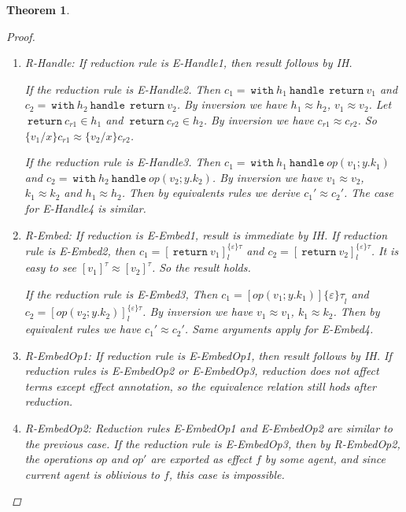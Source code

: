 \documentclass{article}
\newtheorem{theorem}{Theorem}[section]
\theoremstyle{definition}
\newcommand{\m}[1]{\ \texttt{#1}\ }
\begin{document}
\begin{theorem}
\begin{proof}
\begin{enumerate}
\item R-Handle: If reduction rule is E-Handle1, then result follows by IH. 

If the reduction rule is E-Handle2. Then $c_1 = \m{with} h_1 \m{handle} \m{return} v_1$ and $c_2 = \m{with} h_2 \m{handle} \m{return} v_2$. By inversion we have $h_1 \approx h_2$, $v_1 \approx v_2$.  Let $\m{return} c_{r1} \in h_1$ and $\m{return} c_{r2} \in h_2$. By inversion we have $c_{r1} \approx c_{r2}$. So $\{v_1/x\}c_{r1} \approx \{v_2/x\}c_{r2}$.

If the reduction rule is E-Handle3. Then $c_1 = \m{with} h_1 \m{handle} op(v_1; y. k_1)$ and $c_2 = \m{with} h_2 \m{handle} op(v_2; y.k_2) $. By inversion we have $v_1 \approx v_2$, $k_1 \approx k_2$ and $h_1 \approx h_2$. Then by equivalents rules we derive $c_1' \approx c_2'$. The case for E-Handle4 is similar.

\item R-Embed: If reduction is E-Embed1,  result is immediate by IH. If reduction rule is E-Embed2, then $c_1 = [\m{return} v_1]^{\{\varepsilon\}\tau}_l$ and $c_2 = [\m{return} v_2]^{\{\varepsilon\}\tau}_l$. It is easy to see $[v_1]^\tau \approx [v_2]^\tau$. So the result holds.

If the reduction rule is E-Embed3, Then $c_1 = [op(v_1; y. k_1)]{\{\varepsilon\}\tau}_l$ and $c_2 = [op(v_2; y. k_2)]^{\{\varepsilon\}\tau}_l$. By inversion we have $v_1 \approx v_1$, $k_1 \approx k_2$. Then by equivalent rules we have $c_1' \approx c_2'$. Same arguments apply for E-Embed4.

\item R-EmbedOp1: If reduction rule is E-EmbedOp1, then result follows by IH. If reduction rules is E-EmbedOp2 or E-EmbedOp3, reduction does not affect terms except effect annotation, so the equivalence relation still hods after reduction.

\item R-EmbedOp2: Reduction rules E-EmbedOp1 and E-EmbedOp2 are similar to the previous case. If the reduction rule is E-EmbedOp3, then by R-EmbedOp2, the operations $op$ and $op'$ are exported as effect $f$ by some agent, and since current agent is oblivious to $f$, this case is impossible.

\end{enumerate}


\end{proof}


\end{theorem}

\pagebreak
\end{document}
